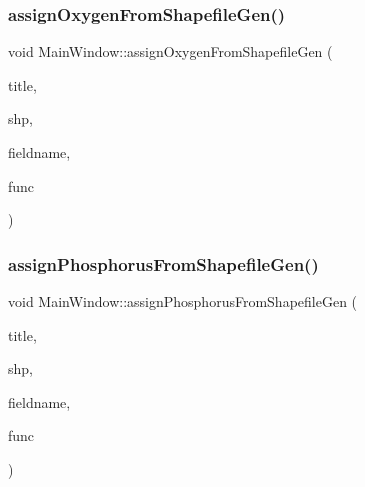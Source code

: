 \subsubsection{\texorpdfstring{assignOxygenFromShapefileGen()}{assignOxygenFromShapefileGen()}}
{\footnotesize\ttfamily void Main\+Window\+::assign\+Oxygen\+From\+Shapefile\+Gen (\begin{DoxyParamCaption}\item[{Q\+String}]{title,  }\item[{Q\+String}]{shp,  }\item[{const char $\ast$const}]{fieldname,  }\item[{std\+::function$<$ void(O\+G\+R\+Geometry $\ast$, int)$>$}]{func }\end{DoxyParamCaption})\hspace{0.3cm}{\ttfamily [protected]}}

\mbox{\label{class_main_window_acee26498d1130667b550bb1e21b1c8fe}} 
\subsubsection{\texorpdfstring{assignPhosphorusFromShapefileGen()}{assignPhosphorusFromShapefileGen()}}
{\footnotesize\ttfamily void Main\+Window\+::assign\+Phosphorus\+From\+Shapefile\+Gen (\begin{DoxyParamCaption}\item[{Q\+String}]{title,  }\item[{Q\+String}]{shp,  }\item[{const char $\ast$const}]{fieldname,  }\item[{std\+::function$<$ void(O\+G\+R\+Geometry $\ast$, int)$>$}]{func }\end{DoxyParamCaption})\hspace{0.3cm}{\ttfamily [protected]}}

\mbox{\label{class_main_window_ac3721d0f2319228619e205ba735e17de}} 
